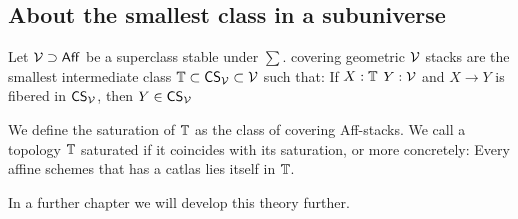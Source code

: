 \subsection{About the smallest class in a subuniverse}
\begin{definition}
	Let $\mathcal{V} \supset \mathsf{Aff}$ be a superclass stable under $\sum$. covering geometric $\mathcal{V}$ stacks are the smallest intermediate class $\mathbb{T} \subset \mathsf{CS}_{\mathcal{V}} \subset \mathcal{V}$ such that: If $X : \mathbb{T}$  $Y : \mathcal{V}$ and $X \to Y$ is fibered in $\mathsf{CS}_{\mathcal{V}}$, then $Y \in \mathsf{CS}_{\mathcal{V}}$
\end{definition}
\begin{definition}
	We define the saturation of $\mathbb{T}$ as the class of covering Aff-stacks. We call a topology $\mathbb{T}$ saturated if it coincides with its saturation, or more concretely: Every affine schemes that has a catlas lies itself in $\mathbb{T}$. \\ 
\end{definition}
In a further chapter we will develop this theory further.



